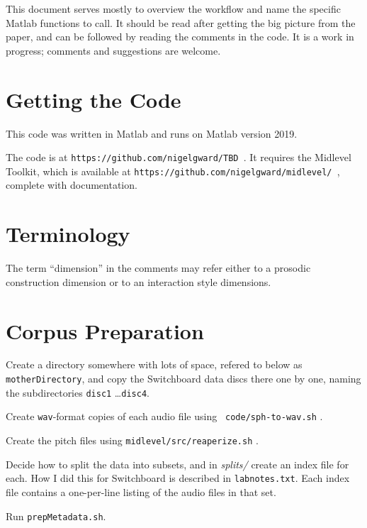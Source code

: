 \documentclass[11pt]{article}
\begin{document}
This document serves mostly to overview the workflow and name the
specific Matlab functions to call.  It should be read after getting
the big picture from the paper, and can be followed by reading the
comments in the code. It is a work in progress; comments and
suggestions are welcome.


\section{Getting the Code}  \label{sec:starting}

This code was written in Matlab and runs on Matlab version 2019.

The code is at {\tt https://github.com/nigelgward/TBD }.  It requires
the Midlevel Toolkit, which is available at 
{\tt https://github.com/nigelgward/midlevel/ }, complete with documentation. 

\section{Terminology}

The term ``dimension'' in the comments may refer either to a prosodic
construction dimension or to an interaction style dimensions.

\section{Corpus Preparation }

Create a directory somewhere with lots of space, refered to below as
{\tt motherDirectory}, and copy the Switchboard data discs there one
by one, naming the subdirectories {\tt disc1} \ldots {\tt disc4}.

Create {\tt wav}-format copies of each audio file using {\tt
  code/sph-to-wav.sh} .

Create the pitch files using {\tt midlevel/src/reaperize.sh} .

Decide how to split the data into subsets, and in {\it splits/} create
an index file for each. How I did this for Switchboard is described in
{\tt labnotes.txt}.  Each index file contains a one-per-line listing
of the audio files in that set.

Run {\tt prepMetadata.sh}.
\end{document}
